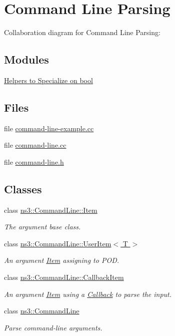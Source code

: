 \hypertarget{group__commandline}{}\section{Command Line Parsing}
\label{group__commandline}
Collaboration diagram for Command Line Parsing\+:
\subsection*{Modules}
\begin{DoxyCompactItemize}
\item 
\hyperlink{group__commandlinehelper}{Helpers to Specialize on bool}
\end{DoxyCompactItemize}
\subsection*{Files}
\begin{DoxyCompactItemize}
\item 
file \hyperlink{command-line-example_8cc}{command-\/line-\/example.\+cc}
\item 
file \hyperlink{command-line_8cc}{command-\/line.\+cc}
\item 
file \hyperlink{command-line_8h}{command-\/line.\+h}
\end{DoxyCompactItemize}
\subsection*{Classes}
\begin{DoxyCompactItemize}
\item 
class \hyperlink{classns3_1_1CommandLine_1_1Item}{ns3\+::\+Command\+Line\+::\+Item}
\begin{DoxyCompactList}\small\item\em The argument base class. \end{DoxyCompactList}\item 
class \hyperlink{classns3_1_1CommandLine_1_1UserItem}{ns3\+::\+Command\+Line\+::\+User\+Item$<$ T $>$}
\begin{DoxyCompactList}\small\item\em An argument \hyperlink{classns3_1_1CommandLine_1_1Item}{Item} assigning to P\+OD. \end{DoxyCompactList}\item 
class \hyperlink{classns3_1_1CommandLine_1_1CallbackItem}{ns3\+::\+Command\+Line\+::\+Callback\+Item}
\begin{DoxyCompactList}\small\item\em An argument \hyperlink{classns3_1_1CommandLine_1_1Item}{Item} using a \hyperlink{classns3_1_1Callback}{Callback} to parse the input. \end{DoxyCompactList}\item 
class \hyperlink{classns3_1_1CommandLine}{ns3\+::\+Command\+Line}
\begin{DoxyCompactList}\small\item\em Parse command-\/line arguments. \end{DoxyCompactList}\end{DoxyCompactItemize}


